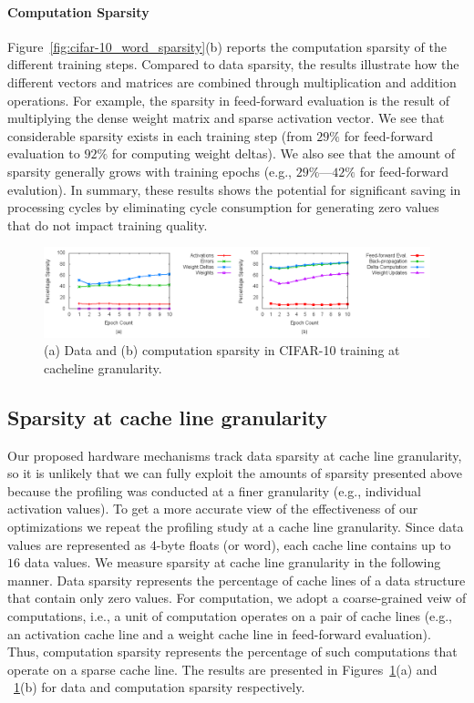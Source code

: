 \paragraph{Computation Sparsity} Figure~\ref{fig:cifar-10_word_sparsity}(b) reports the computation sparsity of the different training steps. Compared to data sparsity, the results illustrate how the different vectors and matrices are combined through multiplication and addition operations.  For example, the sparsity in feed-forward evaluation is the result of multiplying the dense weight matrix and sparse activation vector.  We see that considerable sparsity exists in each training step (from $29\%$ for feed-forward evaluation to $92\%$ for computing weight deltas).  We also see that the amount of sparsity generally grows with training epochs (e.g., $29\%$---$42\%$ for feed-forward evalution).  In summary, these results shows the potential for significant saving in processing cycles by eliminating cycle consumption for generating zero values that do not impact training quality.  

\begin{figure}
 \centering
 \includegraphics[width=1.9\columnwidth]{Figures/cifar-10_cacheline_sparsity.png}
\caption{(a) Data and (b) computation sparsity in CIFAR-10 training at cacheline granularity.}
 \label{fig:cifar-10_cacheline_sparsity}
 \end{figure}

\subsection{Sparsity at cache line granularity}
\label{subsec:sparse_opt_limit}

Our proposed hardware mechanisms track data sparsity at cache line granularity, so it is unlikely that we can fully exploit the amounts of sparsity presented above because the profiling was conducted at a finer granularity (e.g., individual activation values). To get a more accurate view of  the effectiveness of our optimizations we repeat the profiling study at a cache line granularity. Since data values are represented as 4-byte floats (or word), each cache line contains up to $16$ data values. We measure sparsity at cache line granularity in the following manner.  Data sparsity represents the percentage of cache lines of a data structure that contain only zero values.  For computation, we adopt a coarse-grained veiw of computations, i.e., a unit of computation operates on a pair of cache lines (e.g., an activation cache line and a weight cache line in feed-forward evaluation).  Thus,  computation sparsity represents the percentage of such computations that operate on a sparse cache line. The results are presented in Figures~\ref{fig:cifar-10_cacheline_sparsity}(a) and ~\ref{fig:cifar-10_cacheline_sparsity}(b) for data and computation sparsity respectively.  

